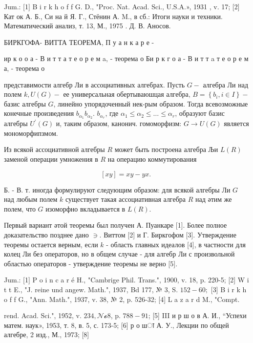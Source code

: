 \documentclass[10pt]{article}
\begin{document}
Jum.: [1] B i r k h o f f G. D., "Proc. Nat. Acad. Sci., U.S.A.», 1931 , v. 17; [2] Кат ок А. Б., Си на й Я. Г., Стёнин А. M., в сб.: Итоги науки и техники. Математический анализ, т. 13, М., 1975 . Д. В. Аносов.



БИРКГОФА- ВИТТА ТЕОРЕМА, П у а н к а р е -

ир к о о а - В и т т а т е о р е м a, - теорема о Би р к г о а - В и т т a т е о р е м а, - теорема о

представимости алгебр Ли в ассоциативных алгебрах. Пусть $G-$ алгебра Ли над полем $k, U(G)-$ ее универсальная обертываюшцая алгебра, $B=\left\{b_{i}, i \in I\right\}-$ базис алгебры $G$, линейно упорядоченный нек-рым образом. Тогда всевозможные конечные произведения $b_{\alpha_{1}} b_{\alpha_{2}}$. $b_{\alpha_{r}}$, где $\alpha_{1} \leqslant \alpha_{2} \leqslant \ldots \leqslant \alpha_{r}$, образуют базис алгебры $U^{\prime}(G)$ и, таким образом, канонич. гомоморфизм: $G \rightarrow U(G)$ является мономорфипзмом.



Из всякой ассоциативной алгебры $R$ может быть построена алгебра Љи $L(R)$ заменой операции умножения в $R$ на операцию коммутирования



\[

[x y]=x y-y x \text {. }

\]



Б. - В. т. иногда формулируют следующим образом: для всякой алгебры Ли $G$ над любым полем $k$ существует такая ассоциативная алгебра $R$ над әтим же полем, что $G$ изоморфно вкладывается в $L(R)$.



Первый вариант әтой теоремы был получен А. Пуанкаре [1]. Более полное доказательство позднее дано $\ni$. Виттом [2] и Г. Биркгофом [3]. Утверждение теоремы остается верным, если $k$ - область главных идеалов [4], в частности для колец Ли без операторов, но в общем случае - для алгебр Ли с произвольной областью операторов - утверждение теоремы не верно [5].



Jum.: [1] P o i n c a r é H., "Cambrige Phil. Trans.", 1900, v. 18, p. 220-5; [2] W i t t E., "J. reine und angew. Math.", 1937, Bd 177, № 3, S. $152-60 ;$ [3] B i r k h o f f G., "Ann. Math.", 1937, v. 38, № 2, p. 526-32; [4] L a z a r d M., "Compt.

rend. Acad. Sci.", 1952, v. $234, \mathcal{N o} 8$, p. $788-91$; [5] III и р ш о в А. И., “Успехи матем. наук», 1953, т. 8, в. 5, с. 173-5; [6] р о шा А. У., Лекции по общей алгебре, 2 изд., М., 1973; [8]
\end{document}
